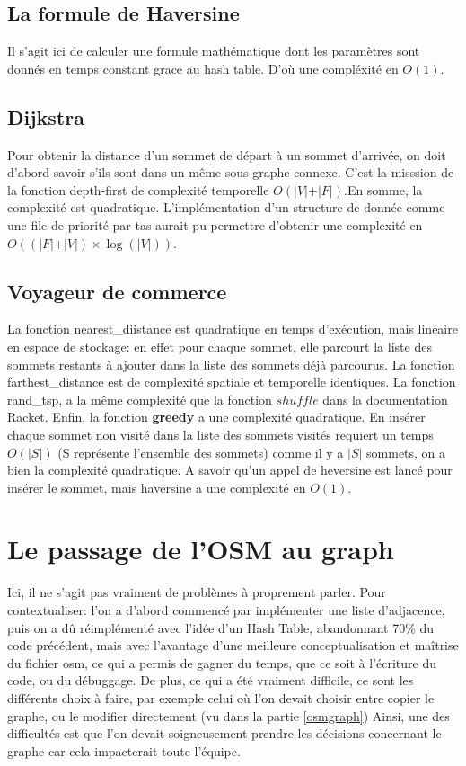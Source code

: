 \documentclass[french]{article}
\begin{document}
\subsection{La formule de Haversine}
Il s'agit ici de calculer une formule mathématique dont les paramètres sont donnés en temps constant grace au hash table. D'où une  compléxité en $O(1)$.
\subsection{Dijkstra}
Pour obtenir la distance d'un sommet de départ à un sommet d'arrivée, on doit d'abord savoir s'ils sont dans un même sous-graphe connexe. C'est la misssion de la fonction depth-first de complexité temporelle $O(\vert V\vert+\vert F\vert)$.En somme, la complexité est quadratique.
L'implémentation d'un structure de donnée comme une file de priorité par tas aurait pu permettre d'obtenir une complexité en $O((\vert F\vert+\vert V\vert)\times\log(\vert V\vert))$.

\subsection{Voyageur de commerce}
La fonction nearest\_diistance est quadratique en temps d'exécution, mais linéaire en espace de stockage: en effet pour chaque sommet, elle parcourt la liste des sommets restants à ajouter dans la liste des sommets déjà parcourus. La fonction farthest\_distance est de complexité spatiale et temporelle identiques.\newline
La fonction rand\_tsp, a la même complexité que la fonction $shuffle$ dans la documentation Racket.\newline
Enfin, la fonction \textbf{greedy} a une complexité quadratique. En insérer chaque sommet non visité  dans la liste des sommets visités requiert un temps $O(\vert S\vert)$ (S représente l'ensemble des sommets) comme il y a $\vert S\vert$ sommets, on a bien la complexité quadratique. A savoir qu'un appel de heversine est lancé pour insérer le sommet, mais haversine a une complexité en $O(1)$.\\
\section{Le passage de l'OSM au graph} 
Ici, il ne s'agit pas vraiment de problèmes à proprement parler. Pour contextualiser: l'on a d'abord commencé par implémenter une liste d'adjacence, puis on a dû réimplémenté avec l'idée d'un Hash Table, abandonnant 70\% du code précédent, mais avec l'avantage d'une meilleure conceptualisation et maîtrise du fichier osm, ce qui a permis de gagner du temps, que ce soit à l'écriture du code, ou du débuggage. De plus, ce qui a été vraiment difficile, ce sont les différents choix à faire, par exemple celui où l'on devait choisir entre copier le graphe, ou le modifier directement (vu dans la partie \ref{osmgraph})
Ainsi, une des difficultés est que l'on devait soigneusement prendre les décisions concernant le graphe car cela impacterait toute l'équipe.
\end{document}
